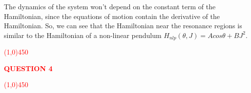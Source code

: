 
The dynamics of the system won't depend on the constant term of the Hamiltonian, since the equations of motion contain the derivative of the Hamiltonian. So, we can see that the Hamiltonian near the resonance regions is similar to the Hamiltonian of a non-linear pendulum $H_{nlp}(\theta,J)= Acos\theta + B J^2$.


%
\textcolor{red}{
\line(1,0){450}\\
\begin{center}
	\textbf{QUESTION 4}
\end{center}
\line(1,0){450}\\
}
%
%
%
%

